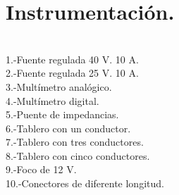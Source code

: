 \documentclass[11pt,a4paper]{article}
\begin{document}
\section{Instrumentaci\'{o}n.}\\
1.-Fuente regulada 40 V. 10 A.\\
2.-Fuente regulada 25 V. 10 A.\\
3.-Mult\'{i}metro anal\'{o}gico.\\
4.-Mult\'{i}metro digital.\\
5.-Puente de impedancias.\\
6.-Tablero con un conductor.\\
7.-Tablero con tres conductores.\\
8.-Tablero con cinco conductores.\\
9.-Foco de 12 V.\\
10.-Conectores de diferente longitud.\\
\pagebreak

\end{document}
